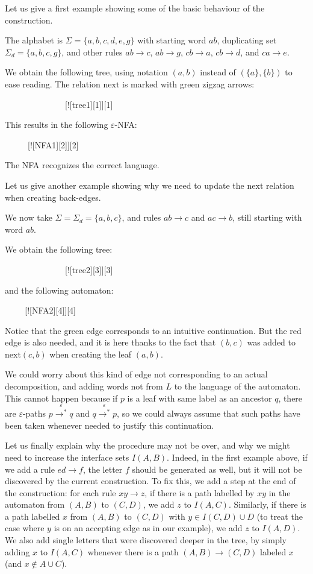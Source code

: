 \documentclass[12pt]{article}
\begin{document}
Let us give a first example showing some of the basic behaviour of the construction.

The alphabet is $\Sigma=\{a,b,c,d,e,g\}$ with starting word $ab$, duplicating set $\Sigma_d=\{a,b,c,g\}$, and other rules $ab\to c$, $ab\to g$, $cb\to a$, $cb\to d$, and $ca\to e$.

We obtain the following tree, using notation $(a,b)$ instead of $(\{a\},\{b\})$ to ease reading. The relation $\mathrm{next}$ is marked with green zigzag arrows:

$\hspace{3cm} $[![tree1][1]][1]

This results in the following $\varepsilon$-NFA:

$\hspace{1cm} $ [![NFA1][2]][2]

The NFA recognizes the correct language.

Let us give another example showing why we need to update the $\mathrm{next}$ relation when creating back-edges.

We now take $\Sigma=\Sigma_d=\{a,b,c\}$, and rules $ab\to c$ and $ac\to b$, still starting with word $ab$.

We obtain the following tree:

$\hspace{3cm} $[![tree2][3]][3]

and the following automaton:

$\hspace{1cm} $[![NFA2][4]][4]
 

Notice that the green edge corresponds to an intuitive continuation. But the red edge is also needed, and it is here thanks to the fact that $(b,c)$ was added to $\mathrm{next}(c,b)$ when creating the leaf $(a,b)$.

We could worry about this kind of edge not corresponding to an actual decomposition, and adding words not from $L$ to the language of the automaton. This cannot happen because if $p$ is a leaf with same label as an ancestor $q$, there are $\varepsilon$-paths $p\stackrel{\varepsilon}{\to^*}q$ and $q\stackrel{\varepsilon}{\to^*}p$, so we could always assume that such paths have been taken whenever needed to justify this continuation.

Let us finally explain why the procedure may not be over, and why we might need to increase the interface sets $I(A,B)$.
Indeed, in the first example above, if we add a rule $ed\to f$, the letter $f$ should be generated as well, but it will not be discovered by the current construction.
To fix this, we add a step at the end of the construction: for each rule $xy\to z$, if there is a path labelled by $xy$ in the automaton from $(A,B)$ to $(C,D)$, we add $z$ to $I(A,C)$. Similarly, if there is a  path labelled $x$ from $(A,B)$ to $(C,D)$ with $y\in I(C,D)\cup D$ (to treat the case where $y$ is on an accepting edge as in our example), we add $z$ to $I(A,D)$.
We also add single letters that were discovered deeper in the tree, by simply adding $x$ to $I(A,C)$ whenever there is a path $(A,B)\to (C,D)$ labeled $x$ (and $x\notin A\cup C$).
\end{document}
